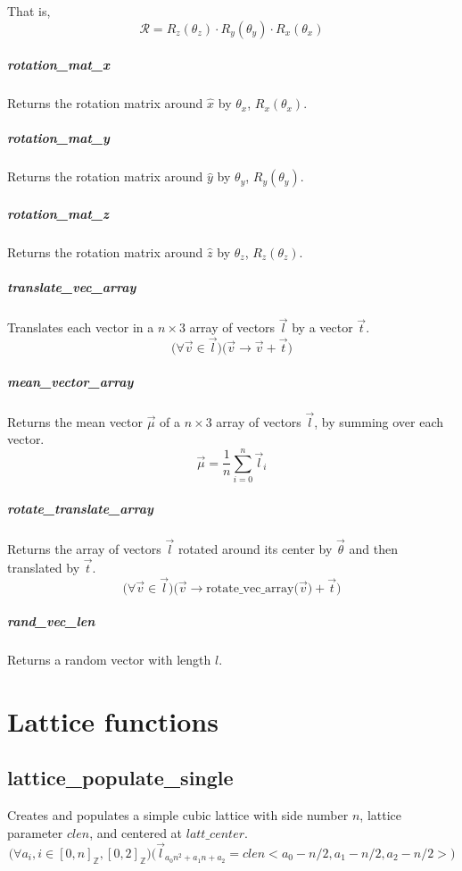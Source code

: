 \documentclass{article}
\begin{document}
			That is,
				\begin{equation}
					\mathcal{R}=R_z(\theta_z)\cdot R_y(\theta_y)\cdot R_x(\theta_x)
				\end{equation}
			
			\subparagraph{rotation\_mat\_x}
				Returns the rotation matrix around $\hat{x}$ by $\theta_x$, $R_x(\theta_x)$.
				
			\subparagraph{rotation\_mat\_y}
				Returns the rotation matrix around $\hat{y}$ by $\theta_y$, $R_y(\theta_y)$.
			
			\subparagraph{rotation\_mat\_z}
				Returns the rotation matrix around $\hat{z}$ by $\theta_z$, $R_z(\theta_z)$.
			
			\subparagraph{translate\_vec\_array}
				Translates each vector in a $n\times 3$	array of vectors $\vec{l}$ by a vector $\vec{t}$.
				\begin{equation}
					\Bigg(\forall \vec{v} \in \vec{l}\Bigg)\Bigg(\vec{v}\to\vec{v}+\vec{t}\Bigg)
				\end{equation}
			
			\subparagraph{mean\_vector\_array}
				Returns the mean vector $\vec{\mu}$ of a $n\times 3$ array of vectors $\vec{l}$, by summing over each vector.
				\begin{equation}
					\vec{\mu} = \frac{1}{n} \sum_{i=0}^{n} \vec{l}_i
				\end{equation}
			
			\subparagraph{rotate\_translate\_array}
				Returns the array of vectors $\vec{l}$ rotated around its center by $\vec{\theta}$ and then translated by $\vec{t}$.
				\begin{equation}
					\Bigg(\forall \vec{v} \in \vec{l}\Bigg)\Bigg(\vec{v}\to \text{rotate\_vec\_array}\big(\vec{v}\big)+\vec{t}\Bigg)
				\end{equation}
			
			\subparagraph{rand\_vec\_len}
				Returns a random vector with length $l$.

			
			
			
	\section{Lattice functions}
		\subsection{lattice\_populate\_single}
			Creates and populates a simple cubic lattice with side number $n$, lattice parameter $clen$, and centered at $latt\_center$.
				\begin{equation}
					\Bigg(  \forall	a_i,i \in [0,n]_{\mathbb{Z}},[0,2]_{\mathbb{Z}}\Bigg) \Bigg( \vec{l}_{a_0 n^2 +a_1 n + a_2} = clen \big< a_0-n/2, a_1-n/2,a_2-n/2 \big>  \Bigg)
				\end{equation}
		
\end{document}

